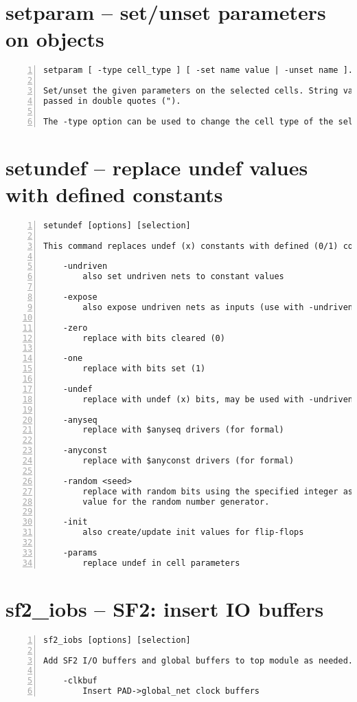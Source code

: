 \section{setparam -- set/unset parameters on objects}
\label{cmd:setparam}
\begin{lstlisting}[numbers=left,frame=single]
    setparam [ -type cell_type ] [ -set name value | -unset name ]... [selection]

Set/unset the given parameters on the selected cells. String values must be
passed in double quotes (").

The -type option can be used to change the cell type of the selected cells.
\end{lstlisting}

\section{setundef -- replace undef values with defined constants}
\label{cmd:setundef}
\begin{lstlisting}[numbers=left,frame=single]
    setundef [options] [selection]

This command replaces undef (x) constants with defined (0/1) constants.

    -undriven
        also set undriven nets to constant values

    -expose
        also expose undriven nets as inputs (use with -undriven)

    -zero
        replace with bits cleared (0)

    -one
        replace with bits set (1)

    -undef
        replace with undef (x) bits, may be used with -undriven

    -anyseq
        replace with $anyseq drivers (for formal)

    -anyconst
        replace with $anyconst drivers (for formal)

    -random <seed>
        replace with random bits using the specified integer as seed
        value for the random number generator.

    -init
        also create/update init values for flip-flops

    -params
        replace undef in cell parameters
\end{lstlisting}

\section{sf2\_iobs -- SF2: insert IO buffers}
\label{cmd:sf2_iobs}
\begin{lstlisting}[numbers=left,frame=single]
    sf2_iobs [options] [selection]

Add SF2 I/O buffers and global buffers to top module as needed.

    -clkbuf
        Insert PAD->global_net clock buffers
\end{lstlisting}

